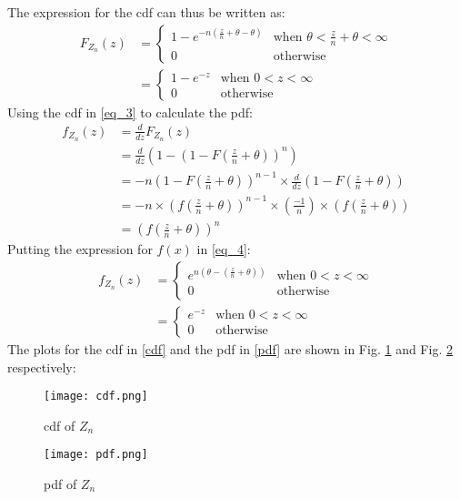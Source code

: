 \documentclass[journal,12pt,twocolumn]{IEEEtran}
\providecommand{\brak}[1]{\ensuremath{\left(#1\right)}}
\theoremstyle{remark}
\numberwithin{equation}{subsection}
\begin{document}
The expression for the cdf can thus be written as:
\begin{align}
    F_{Z_n}(z) &=\nonumber
    \begin{cases}
    1-e^{-n(\frac{z}{n}+\theta-\theta)}&\text{when } \theta<\frac{z}{n}+\theta<\infty\\
    0&\text{otherwise}
    \end{cases}\\
    &= \begin{cases}
    1-e^{-z}&\text{when } 0<z<\infty\\
    0 &\text{otherwise}\label{cdf}
    \end{cases}
\end{align}
Using the cdf in \eqref{eq_3} to calculate the pdf:
\begin{align}
    f_{Z_n}(z) &= \frac{d}{dz}F_{Z_n}(z)\nonumber\\
    &= \frac{d}{dz}\brak{1-\brak{1-F\brak{\frac{z}{n}+\theta}}^n}\nonumber\\
    &= -n\brak{1-F\brak{\frac{z}{n}+\theta}}^{n-1}\times\frac{d}{dz}\brak{1-F\brak{\frac{z}{n}+\theta}}\nonumber\\
    &= -n\times\brak{f\brak{\frac{z}{n}+\theta}}^{n-1}\times\brak{\frac{-1}{n}}\times\brak{f\brak{\frac{z}{n}+\theta}}\nonumber\\
    &= \brak{f\brak{\frac{z}{n}+\theta}}^n\label{eq_4}
\end{align}
Putting the expression for $f(x)$ in \eqref{eq_4}:
\begin{align}
    f_{Z_n}(z) &=\nonumber
    \begin{cases}
    e^{n\brak{\theta-\brak{\frac{z}{n}+\theta}}}& \text{when } 0<z<\infty\\
    0&\text{otherwise}
    \end{cases}\\
    &= 
    \begin{cases}
    e^{-z} &\text{when } 0<z<\infty\\
    0&\text{otherwise}
    \end{cases}\label{pdf}
\end{align}
The plots for the cdf in \eqref{cdf} and the pdf in \eqref{pdf} are shown in Fig. \ref{fig_cdf} and Fig. \ref{fig_pdf} respectively:
\begin{figure}[H]
    \centering
    \texttt{[image: cdf.png]}
    \caption{cdf of $Z_n$}
    \label{fig_cdf}
\end{figure}
\begin{figure}[H]
    \centering
    \texttt{[image: pdf.png]}
    \caption{pdf of $Z_n$}
    \label{fig_pdf}
\end{figure}
\end{document}
